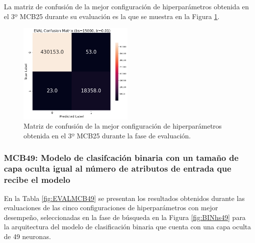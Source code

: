 La matriz de confusión de la mejor configuración de hiperparámetros obtenida en el 3º MCB25 durante su evaluación es la que se muestra en la Figura \ref{fig:MC_EVAL_MCB25}.

\begin{figure}[H]
    \centering
    \includegraphics[width=0.5\textwidth]{./img/evaluacion/matrices_confusion/MC_EVAL_MCB25.png}
    \caption{Matriz de confusión de la mejor configuración de hiperparámetros obtenida en el 3º MCB25 durante la fase de evaluación.}
    \label{fig:MC_EVAL_MCB25}
\end{figure}


\subsubsection{MCB49: Modelo de clasifcación binaria con un tamaño de capa oculta igual al número de atributos de entrada que recibe el modelo}
En la Tabla \ref{fig:EVALMCB49} se presentan los resultados obtenidos durante las evaluaciones de las cinco configuraciones de hiperparámetros con mejor desempeño, seleccionadas en la fase de búsqueda en la Figura \ref{fig:BINhs49} para la arquitectura del modelo de clasificación binaria que cuenta con una capa oculta de 49 neuronas.



